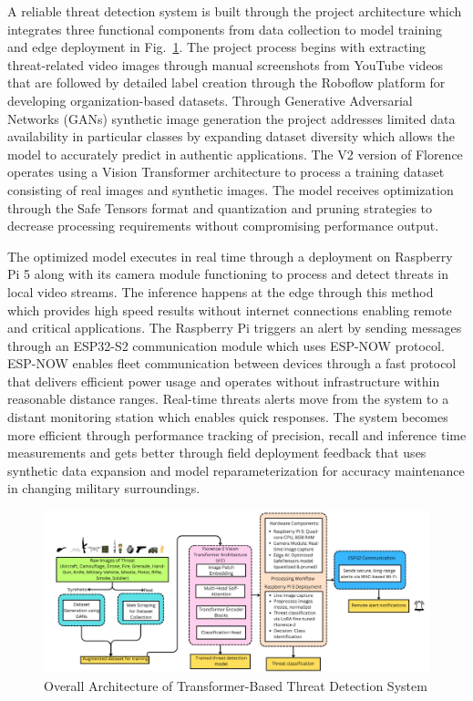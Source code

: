 \documentclass[fleqn,10pt,lineno]{wlpeerj}
\begin{document}
A reliable threat detection system is built through the project architecture which integrates three functional components from data collection to model training and edge deployment in Fig.~\ref{fig:overall-arch}. The project process begins with extracting threat-related video images through manual screenshots from YouTube videos that are followed by detailed label creation through the Roboflow platform for developing organization-based datasets. Through Generative Adversarial Networks (GANs) synthetic image generation the project addresses limited data availability in particular classes by expanding dataset diversity which allows the model to accurately predict in authentic applications. The V2 version of Florence operates using a Vision Transformer architecture to process a training dataset consisting of real images and synthetic images. The model receives optimization through the Safe Tensors format and quantization and pruning strategies to decrease processing requirements without compromising performance output. 

The optimized model executes in real time through a deployment on Raspberry Pi 5 along with its camera module functioning to process and detect threats in local video streams. The inference happens at the edge through this method which provides high speed results without internet connections enabling remote and critical applications. The Raspberry Pi triggers an alert by sending messages through an ESP32-S2 communication module which uses ESP-NOW protocol. ESP-NOW enables fleet communication between devices through a fast protocol that delivers efficient power usage and operates without infrastructure within reasonable distance ranges. Real-time threats alerts move from the system to a distant monitoring station which enables quick responses. The system becomes more efficient through performance tracking of precision, recall and inference time measurements and gets better through field deployment feedback that uses synthetic data expansion and model reparameterization for accuracy maintenance in changing military surroundings. 

\begin{figure}[H]
    \centering
    \includegraphics[width=1\linewidth]{overall_architecture.jpg}
    \caption{Overall Architecture of Transformer-Based Threat Detection System  }
    \label{fig:overall-arch}
\end{figure}
\end{document}

